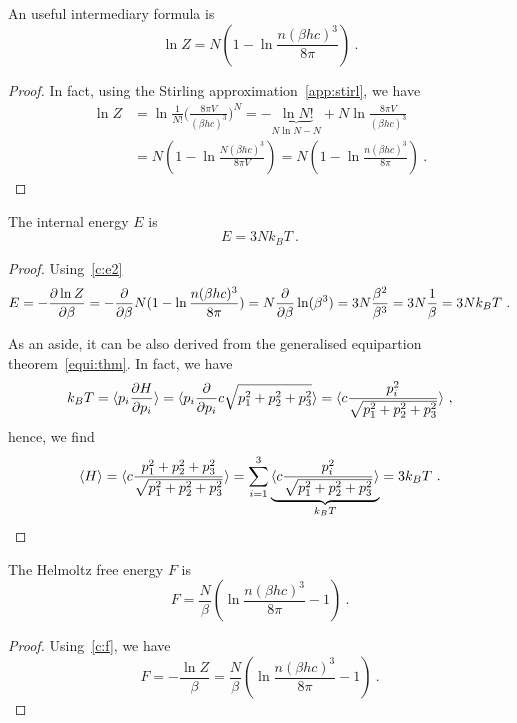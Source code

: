     An useful intermediary formula is 
    \begin{equation*}
        \ln Z = N (1 - \ln \frac{n (\beta h c)^3}{8\pi}) ~.
    \end{equation*}
    \begin{proof}
        In fact, using the Stirling approximation~\eqref{app:stirl}, we have
        \begin{equation*}
        \begin{aligned}
            \ln Z & = \ln \frac{1}{N!} \Big (\frac{8\pi V}{(\beta h c)^3} \Big )^N = - \underbrace{\ln N!}_{N \ln N - N} + N \ln \frac{8\pi V}{(\beta h c)^3} \\ & = N (1 - \ln \frac{N (\beta h c)^3}{8\pi V}) = N (1 - \ln \frac{n (\beta h c)^3}{8\pi}) ~.
        \end{aligned}
        \end{equation*}
    \end{proof}
    
    The internal energy $E$ is 
    \begin{equation*}
        E = 3 N k_B T ~.
    \end{equation*}
    \begin{proof}
        Using~\eqref{c:e2}
        \begin{equation*}
            E = - \frac{\partial\ln Z}{\partial\beta} = - \frac{\partial}{\partial\beta} N (1 - \ln \frac{n (\beta h c)^3}{8\pi}) = N \frac{\partial}{\partial\beta} \ln (\beta^3) = 3 N \frac{\beta^2}{\beta^3} = 3 N \frac{1}{\beta} = 3 N k_B T ~.
        \end{equation*}

        As an aside, it can be also derived from the generalised equipartion theorem~\eqref{equi:thm}. In fact, we have
        \begin{equation*}
            k_B T = \langle p_i \frac{\partial H}{\partial p_i}\rangle = \langle p_i \frac{\partial}{\partial p_i} c \sqrt{p_1^2 + p_2^2 + p_3^2}\rangle = \langle c \frac{p_i^2}{\sqrt{p_1^2 + p_2^2 + p_3^2}}\rangle ~,
        \end{equation*}
        hence, we find
        \begin{equation*}
            \langle H\rangle = \langle c \frac{p_1^2 + p_2^2 + p_3^2}{\sqrt{p_1^2 + p_2^2 + p_3^2}}\rangle = \sum_{i=1}^3 \underbrace{\langle c \frac{p_i^2}{\sqrt{p_1^2 + p_2^2 + p_3^2}}\rangle}_{k_B T} = 3 k_B T ~.
        \end{equation*}
    \end{proof}
    
    The Helmoltz free energy $F$ is 
    \begin{equation*}
        F = \frac{N}{\beta} (\ln \frac{n (\beta h c)^3}{8\pi} - 1) ~.
    \end{equation*}
    \begin{proof}
        Using~\eqref{c:f}, we have
        \begin{equation*}
            F = - \frac{\ln Z}{\beta} = \frac{N}{\beta} (\ln \frac{n (\beta h c)^3}{8\pi} - 1) ~.
        \end{equation*}
    \end{proof}
    
